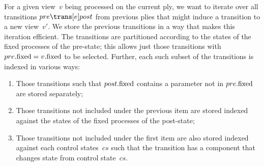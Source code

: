 For a given view~$v$ being processed on the current ply, we want to iterate
over all transitions $pre \trans[e] post$ from previous plies that might
induce a transition to a new view~$v'$.  We store the previous transitions in
a way that makes this iteration efficient.  The  transitions are
partitioned according to the states of the fixed processes of the pre-state;
this allows just those transitions with $pre.\mathrm{fixed} = v.\mathrm{fixed}$ to be
selected.
Further, each such subset of the transitions is indexed in various ways:
%
\begin{enumerate}
\item\label{item:mightGiveSufficientUnifs-1} Those transitions such that
  $post.\mathrm{fixed}$ contains a parameter not in $pre.\mathrm{fixed}$ are stored
  separately;

\item\label{item:mightGiveSufficientUnifs-2} Those transitions not included
  under the previous item are stored indexed against the states of the
  fixed processes of the post-state;

\item\label{item:mightGiveSufficientUnifs-3} Those transitions not included
  under the first item are also stored indexed against each control
  states~$cs$ such that the transition has a component that changes state from
  control state~$cs$.
\end{enumerate}

